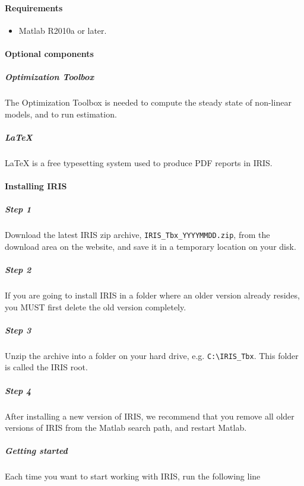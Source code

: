 

	\paragraph{Requirements}

\begin{itemize}
\itemsep1pt\parskip0pt
\item
  Matlab R2010a or later.
\end{itemize}

\paragraph{Optional components}

\subparagraph{Optimization Toolbox}

The Optimization Toolbox is needed to compute the steady state of
non-linear models, and to run estimation.

\subparagraph{LaTeX}

LaTeX is a free typesetting system used to produce PDF reports in IRIS.

\paragraph{Installing IRIS}

\subparagraph{Step 1}

Download the latest IRIS zip archive, \texttt{IRIS\_Tbx\_YYYYMMDD.zip},
from the download area on the website, and save it in a temporary
location on your disk.

\subparagraph{Step 2}

If you are going to install IRIS in a folder where an older version
already resides, you MUST first delete the old version completely.

\subparagraph{Step 3}

Unzip the archive into a folder on your hard drive, e.g.
\texttt{C:\textbackslash{}IRIS\_Tbx}. This folder is called the IRIS
root.

\subparagraph{Step 4}

After installing a new version of IRIS, we recommend that you remove all
older versions of IRIS from the Matlab search path, and restart Matlab.

\subparagraph{Getting started}

Each time you want to start working with IRIS, run the following line

